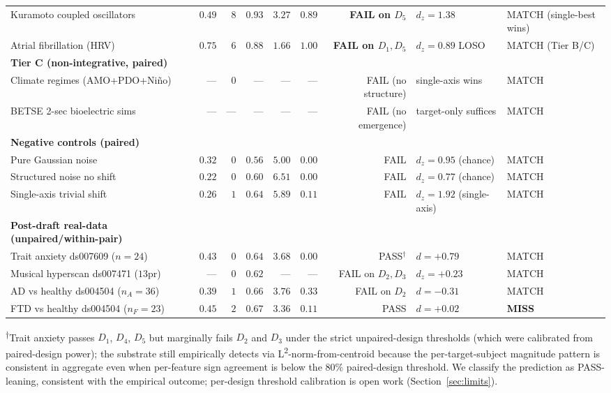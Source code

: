 \documentclass[11pt,a4paper]{article}
\begin{document}
\begin{table}[h]
{\begin{tabular}{lrrrrrrll}
Kuramoto coupled oscillators & $0.49$ & $8$ & $0.93$ & $3.27$ & $0.89$ & \textbf{FAIL on $D_5$} & $d_z = 1.38$ & MATCH (single-best wins) \\
Atrial fibrillation (HRV) & $0.75$ & $6$ & $0.88$ & $1.66$ & $1.00$ & \textbf{FAIL on $D_1, D_5$} & $d_z = 0.89$ LOSO & MATCH (Tier B/C) \\
\midrule
\textbf{Tier C (non-integrative, paired)} & & & & & & & & \\
Climate regimes (AMO+PDO+Ni\~no) & --- & $0$ & --- & --- & --- & FAIL (no structure) & single-axis wins & MATCH \\
BETSE 2-sec bioelectric sims & --- & --- & --- & --- & --- & FAIL (no emergence) & target-only suffices & MATCH \\
\midrule
\textbf{Negative controls (paired)} & & & & & & & & \\
Pure Gaussian noise & $0.32$ & $0$ & $0.56$ & $5.00$ & $0.00$ & FAIL & $d_z = 0.95$ (chance) & MATCH \\
Structured noise no shift & $0.22$ & $0$ & $0.60$ & $6.51$ & $0.00$ & FAIL & $d_z = 0.77$ (chance) & MATCH \\
Single-axis trivial shift & $0.26$ & $1$ & $0.64$ & $5.89$ & $0.11$ & FAIL & $d_z = 1.92$ (single-axis) & MATCH \\
\midrule
\textbf{Post-draft real-data (unpaired/within-pair)} & & & & & & & & \\
Trait anxiety ds007609 ($n=24$) & $0.43$ & $0$ & $0.64$ & $3.68$ & $0.00$ & PASS$^{\dagger}$ & $d=+0.79$ & MATCH \\
Musical hyperscan ds007471 ($13$pr) & --- & $0$ & $0.62$ & --- & --- & FAIL on $D_2,D_3$ & $d_z=+0.23$ & MATCH \\
AD vs healthy ds004504 ($n_A=36$) & $0.39$ & $1$ & $0.66$ & $3.76$ & $0.33$ & FAIL on $D_2$ & $d=-0.31$ & MATCH \\
FTD vs healthy ds004504 ($n_F=23$) & $0.45$ & $2$ & $0.67$ & $3.36$ & $0.11$ & PASS & $d=+0.02$ & \textbf{MISS} \\
\bottomrule\end{tabular}}
\end{table}

\textsuperscript{$\dagger$}Trait anxiety passes $D_1$, $D_4$, $D_5$ but marginally fails $D_2$ and $D_3$ under the strict unpaired-design thresholds (which were calibrated from paired-design power); the substrate still empirically detects via L\textsuperscript{2}-norm-from-centroid because the per-target-subject magnitude pattern is consistent in aggregate even when per-feature sign agreement is below the $80\%$ paired-design threshold. We classify the prediction as PASS-leaning, consistent with the empirical outcome; per-design threshold calibration is open work (Section~\ref{sec:limits}).
\end{document}
